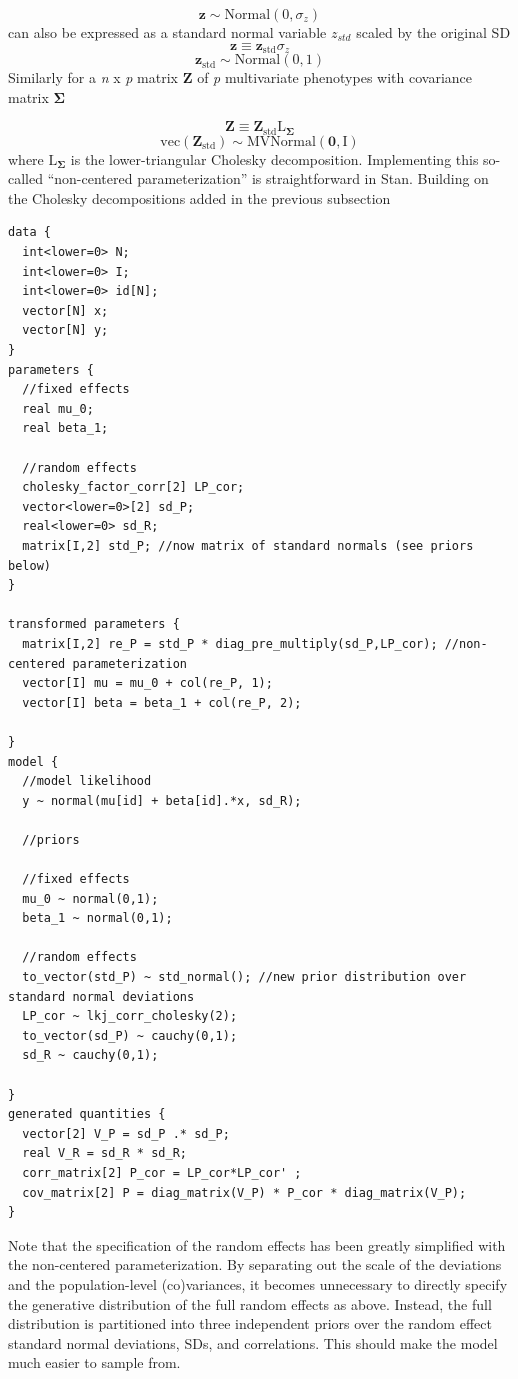 \documentclass[
]{book}
\begin{document}
\[\boldsymbol{z} \sim \mathrm{Normal}(0,\sigma_z)\]
can also be expressed as a standard normal variable \(z_{std}\) scaled by the original SD
\[\boldsymbol{z} \equiv \boldsymbol{z_{\mathrm{std}}}\sigma_z\]
\[\boldsymbol{z_{\mathrm{std}}} \sim \mathrm{Normal}(0,1)\]
Similarly for a \emph{n} x \emph{p} matrix \(\boldsymbol{Z}\) of \emph{p} multivariate phenotypes with covariance matrix \(\boldsymbol{\Sigma}\)

\[\boldsymbol{Z} \equiv   \boldsymbol{Z_{\mathrm{std}}} \boldsymbol{\mathrm{L}_{\Sigma}}\]
\[\mathrm{vec}(\boldsymbol{Z_{\mathrm{std}}}) \sim \mathrm{MVNormal}(\boldsymbol{0},\boldsymbol{\mathrm{I}})\]
where \(\boldsymbol{\mathrm{L}_{\Sigma}}\) is the lower-triangular Cholesky decomposition. Implementing this so-called ``non-centered parameterization'' is straightforward in Stan. Building on the Cholesky decompositions added in the previous subsection

\begin{verbatim}
data {
  int<lower=0> N; 
  int<lower=0> I; 
  int<lower=0> id[N]; 
  vector[N] x; 
  vector[N] y;
}
parameters {
  //fixed effects
  real mu_0;
  real beta_1;
  
  //random effects
  cholesky_factor_corr[2] LP_cor;
  vector<lower=0>[2] sd_P;
  real<lower=0> sd_R;
  matrix[I,2] std_P; //now matrix of standard normals (see priors below)
}

transformed parameters {
  matrix[I,2] re_P = std_P * diag_pre_multiply(sd_P,LP_cor); //non-centered parameterization
  vector[I] mu = mu_0 + col(re_P, 1);
  vector[I] beta = beta_1 + col(re_P, 2);

}
model {
  //model likelihood
  y ~ normal(mu[id] + beta[id].*x, sd_R);

  //priors
  
  //fixed effects
  mu_0 ~ normal(0,1);
  beta_1 ~ normal(0,1);
  
  //random effects
  to_vector(std_P) ~ std_normal(); //new prior distribution over standard normal deviations
  LP_cor ~ lkj_corr_cholesky(2);
  to_vector(sd_P) ~ cauchy(0,1);
  sd_R ~ cauchy(0,1);
  
}
generated quantities {
  vector[2] V_P = sd_P .* sd_P;
  real V_R = sd_R * sd_R;
  corr_matrix[2] P_cor = LP_cor*LP_cor' ; 
  cov_matrix[2] P = diag_matrix(V_P) * P_cor * diag_matrix(V_P); 
}
\end{verbatim}

Note that the specification of the random effects has been greatly simplified with the non-centered parameterization. By separating out the scale of the deviations and the population-level (co)variances, it becomes unnecessary to directly specify the generative distribution of the full random effects as above. Instead, the full distribution is partitioned into three independent priors over the random effect standard normal deviations, SDs, and correlations. This should make the model much easier to sample from.
\end{document}
